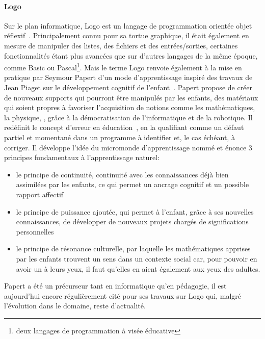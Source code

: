         \paragraph{Logo}
            Sur le plan informatique, Logo est un langage de programmation orientée objet réflexif~. Principalement connu pour sa tortue graphique, il était également en mesure de manipuler des listes, des fichiers et des entrées/sorties, certaines fonctionnalités étant plus avancées que sur d'autres langages de la même époque, comme Basic ou Pascal\footnote{deux langages de programmation à visée éducative}.
            Mais le terme Logo renvoie également à la mise en pratique par Seymour Papert d'un mode d’apprentissage inspiré des travaux de Jean Piaget sur le développement cognitif de l’enfant~. Papert propose de créer de nouveaux supports qui pourront être manipulés par les enfants, des matériaux qui soient propres à favoriser l’acquisition de notions comme les mathématiques, la physique, \etc, grâce à la démocratisation de l’informatique et de la robotique. Il redéfinit le concept d'erreur en éducation~, en la qualifiant comme un défaut partiel et momentané dans un programme  à identifier et, le cas échéant, à corriger. Il développe l'idée du micromonde d'apprentissage nommé  et énonce 3 principes fondamentaux à l'apprentissage naturel:
            \begin{itemize}\myItemStyle
                \item le principe de continuité, continuité avec les connaissances déjà bien assimilées par les enfants, ce qui permet un ancrage cognitif et un possible rapport affectif
                \item le principe de puissance ajoutée, qui permet à l’enfant, grâce à ses nouvelles connaissances, de développer de nouveaux projets chargés de significations personnelles 
                \item le principe de résonance culturelle, par laquelle les mathématiques apprises par les enfants trouvent un sens dans un contexte social car, pour pouvoir en avoir un à leurs yeux, il faut qu’elles en aient également aux yeux des adultes.
            \end{itemize}{}\par%
            Papert a été un précurseur tant en informatique qu'en pédagogie, il est aujourd'hui encore régulièrement cité pour ses travaux sur Logo qui, malgré l'évolution dans le domaine, reste d'actualité.
